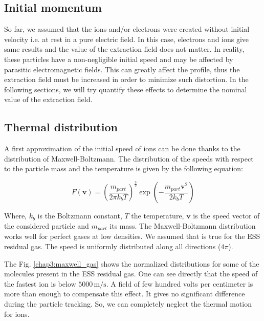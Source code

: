 \begin{refsection}
  \section{Initial momentum}
  So far, we assumed that the ions and/or electrons were created without initial velocity i.e. at rest in a pure electric field. In this case, electrons and ions give same results and the value of the extraction field does not matter. In reality, these particles have a non-negligible initial speed and may be affected by parasitic electromagnetic fields. This can greatly affect the profile, thus the extraction field must be increased in order to minimize such distortion. In the following sections, we will try quantify these effects to determine the nominal value of the extraction field.

  \subsection{Thermal distribution}
  A first approximation of the initial speed of ions can be done thanks to the distribution of Maxwell-Boltzmann. The distribution of the speeds with respect to the particle mass and the temperature is given by the following equation:

  \begin{equation}
    F(\boldsymbol{v}) = \left(\frac{m_{part}}{2 \pi k_{b} T}\right)^{\frac{3}{2}}\exp\left(-\frac{m_{part}\boldsymbol{v}^{2}}{2 k_{b} T}\right)
  \end{equation}
  
  Where, $k_{b}$ is the Boltzmann constant, $T$ the temperature, $\boldsymbol{v}$ is the speed vector of the considered particle and $m_{part}$ its mass. The Maxwell-Boltzmann distribution works well for perfect gases at low densities. We assumed that is true for the ESS residual gas. The speed is uniformly distributed along all directions ($4\pi$).

  The Fig. \ref{chap3:maxwell_gas} shows the normalized distributions for some of the molecules present in the ESS residual gas. One can see directly that the speed of the fastest ion is below $5000\,\mathrm{m/s}$. A field of few hundred volts per centimeter is more than enough to compensate this effect. It gives no significant difference during the particle tracking. So, we can completely neglect the thermal motion for ions.


\end{refsection}
